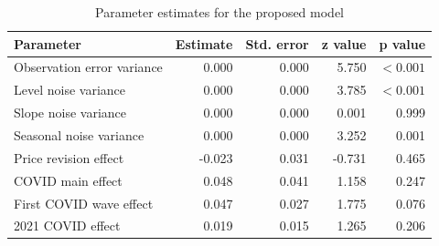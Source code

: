 \begin{table}[htbp]
  \centering
  \caption{Parameter estimates for the proposed model}
  \label{tab:final-model-params}
  \begin{tabular}{lrrrr}
    \hline
    Parameter & Estimate & Std. error & z value & p value \\
    \hline
    Observation error variance & 0.000 & 0.000 & 5.750 & $<0.001$ \\
    Level noise variance & 0.000 & 0.000 & 3.785 & $<0.001$ \\
    Slope noise variance & 0.000 & 0.000 & 0.001 & 0.999 \\
    Seasonal noise variance & 0.000 & 0.000 & 3.252 & 0.001 \\
    Price revision effect & -0.023 & 0.031 & -0.731 & 0.465 \\
    COVID main effect & 0.048 & 0.041 & 1.158 & 0.247 \\
    First COVID wave effect & 0.047 & 0.027 & 1.775 & 0.076 \\
    2021 COVID effect & 0.019 & 0.015 & 1.265 & 0.206 \\
    \hline
  \end{tabular}
\end{table}
